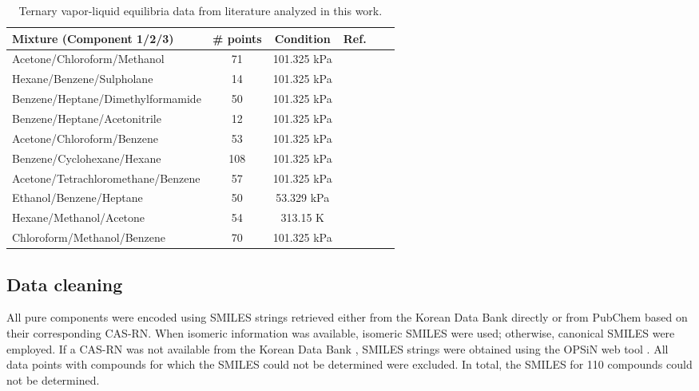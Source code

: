 \begin{table}[h]
\centering
  \caption{Ternary vapor-liquid equilibria data from literature analyzed in this work.}
  \label{tbl:ternary_systems}
  \small
  \begin{tabular*}{1\textwidth}{@{\extracolsep{\fill}}lccccl}
    \hline
    \textbf{Mixture (Component 1/2/3)} & \textbf{\# points} & \textbf{Condition} & \textbf{Ref.} \\
    \hline
    Acetone/Chloroform/Methanol          & 71  & 101.325 kPa  & \cite{hiak1994vapor} \\
    Hexane/Benzene/Sulpholane            & 14  & 101.325 kPa  & \cite{rawat1980isobaric} \\
    Benzene/Heptane/Dimethylformamide    & 50  & 101.325 kPa  & \cite{blanco2000vapor} \\
    Benzene/Heptane/Acetonitrile         & 12  & 101.325 kPa  & \cite{tripathi1975isobaric} \\
    Acetone/Chloroform/Benzene           & 53  & 101.325 kPa  & \cite{kojima1991isobaric} \\
    Benzene/Cyclohexane/Hexane           & 108 & 101.325 kPa  & \cite{ridgway1967physical} \\
    Acetone/Tetrachloromethane/Benzene   & 57  & 101.325 kPa  & \cite{subbarao1966isobaric} \\
    Ethanol/Benzene/Heptane              & 50  & 53.329 kPa   & \cite{nielsen1959vapor} \\
    Hexane/Methanol/Acetone              & 54  & 313.15 K     & \cite{oracz1995vapour} \\
    Chloroform/Methanol/Benzene          & 70  & 101.325 kPa  & \cite{kurihara1998vapor} \\
    \hline
  \end{tabular*}
\end{table}


\subsection{Data cleaning}

All pure components were encoded using SMILES strings retrieved either from the Korean Data Bank \cite{koreandatabank} directly or from PubChem \cite{pubchem} based on their corresponding CAS-RN. When isomeric information was available, isomeric SMILES were used; otherwise, canonical SMILES were employed. If a CAS-RN was not available from the Korean Data Bank \cite{koreandatabank}, SMILES strings were obtained using the OPSiN web tool \cite{opsin}. All data points with compounds for which the SMILES could not be determined were excluded. In total, the SMILES for 110 compounds could not be determined.

